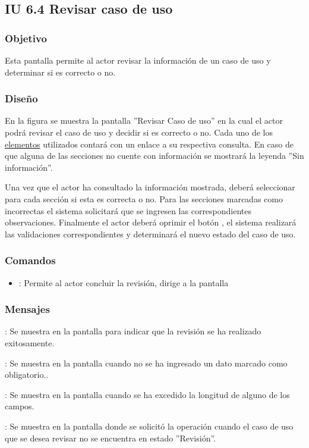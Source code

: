 \subsection{IU 6.4 Revisar caso de uso}

\subsubsection{Objetivo}
	Esta pantalla permite al actor revisar la información de un caso de uso y determinar si es correcto o no.
\subsubsection{Diseño}
	En la figura  se muestra la pantalla ''Revisar Caso de uso'' en la cual el actor podrá revisar el caso de uso y decidir si es correcto o no. Cada uno de los \hyperlink{tElemento}{elementos} utilizados contará con un enlace a su respectiva consulta. En caso de que alguna de las secciones no cuente con información se mostrará la leyenda ''Sin información''.
	
	Una vez que el actor ha consultado la información mostrada, deberá seleccionar para cada sección si esta es correcta o no. Para las secciones marcadas como incorrectas el sistema solicitará que se ingresen las correspondientes observaciones. Finalmente el actor deberá oprimir el botón  , el sistema realizará las validaciones correspondientes y determinará el nuevo estado del caso de uso.

\subsubsection{Comandos}
\begin{itemize}
	\item {}: Permite al actor concluir la revisión, dirige a la pantalla 
\end{itemize}

\subsubsection{Mensajes}

\begin{Citemize}
	\item {}: Se muestra en la pantalla  para indicar que la revisión se ha realizado exitosamente.
	\item {}: Se muestra en la pantalla  cuando no se ha ingresado un dato marcado como obligatorio..
	\item {}: Se muestra en la pantalla  cuando se ha excedido la longitud de alguno de los campos.
	\item {}: Se muestra en la pantalla donde se solicitó la operación cuando el caso de uso que se desea revisar no se encuentra en estado ''Revisión''.
\end{Citemize}
